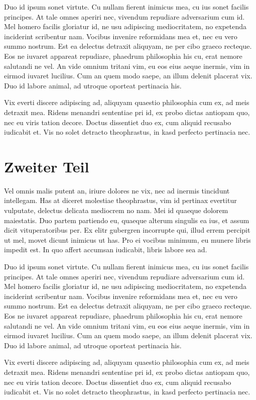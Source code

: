 Duo id ipsum sonet virtute. Cu nullam fierent inimicus mea, cu ius sonet facilis principes. At tale omnes aperiri nec, vivendum repudiare adversarium cum id. Mel homero facilis gloriatur id, ne usu adipiscing mediocritatem, no expetenda inciderint scribentur nam. Vocibus invenire reformidans mea et, nec eu vero summo nostrum. Est ea delectus detraxit aliquyam, ne per cibo graeco recteque. Eos ne iuvaret appareat repudiare, phaedrum philosophia his cu, erat nemore salutandi ne vel. An vide omnium tritani vim, eu eos eius aeque inermis, vim in eirmod iuvaret lucilius. Cum an quem modo saepe, an illum delenit placerat vix. Duo id labore animal, ad utroque oporteat pertinacia his.

Vix everti discere adipiscing ad, aliquyam quaestio philosophia cum ex, ad meis detraxit mea. Ridens menandri sententiae pri id, ex probo dictas antiopam quo, nec eu viris tation decore. Doctus dissentiet duo ex, cum aliquid recusabo iudicabit et. Vis no solet detracto theophrastus, in kasd perfecto pertinacia nec.

\section{Zweiter Teil}
\label{a_zweiter_teil}
Vel omnis malis putent an, iriure dolores ne vix, nec ad inermis tincidunt intellegam. Has at diceret molestiae theophrastus, vim id pertinax evertitur vulputate, delectus delicata mediocrem no nam. Mei id quaeque dolorem maiestatis. Duo partem partiendo eu, quaeque alterum singulis ea ius, et assum dicit vituperatoribus per. Ex elitr gubergren incorrupte qui, illud errem percipit ut mel, movet dicunt inimicus ut has. Pro ei vocibus minimum, eu munere libris impedit est. In quo affert accumsan iudicabit, libris labore sea ad.

Duo id ipsum sonet virtute. Cu nullam fierent inimicus mea, cu ius sonet facilis principes. At tale omnes aperiri nec, vivendum repudiare adversarium cum id. Mel homero facilis gloriatur id, ne usu adipiscing mediocritatem, no expetenda inciderint scribentur nam. Vocibus invenire reformidans mea et, nec eu vero summo nostrum. Est ea delectus detraxit aliquyam, ne per cibo graeco recteque. Eos ne iuvaret appareat repudiare, phaedrum philosophia his cu, erat nemore salutandi ne vel. An vide omnium tritani vim, eu eos eius aeque inermis, vim in eirmod iuvaret lucilius. Cum an quem modo saepe, an illum delenit placerat vix. Duo id labore animal, ad utroque oporteat pertinacia his.

Vix everti discere adipiscing ad, aliquyam quaestio philosophia cum ex, ad meis detraxit mea. Ridens menandri sententiae pri id, ex probo dictas antiopam quo, nec eu viris tation decore. Doctus dissentiet duo ex, cum aliquid recusabo iudicabit et. Vis no solet detracto theophrastus, in kasd perfecto pertinacia nec.